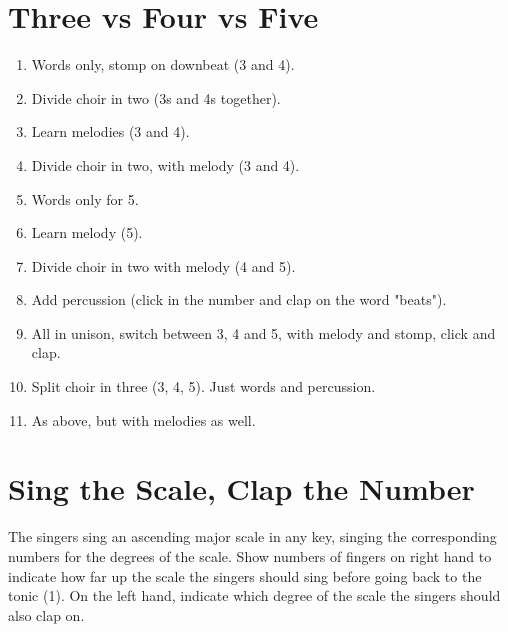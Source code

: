 \documentclass{article}
\begin{document}
\section{Three vs Four vs Five}
\begin{enumerate}
	\item Words only, stomp on downbeat (3 and 4).
	\item Divide choir in two (3s and 4s together).
	\item Learn melodies (3 and 4).
	\item Divide choir in two, with melody (3 and 4).
	\item Words only for 5.
	\item Learn melody (5).
	\item Divide choir in two with melody (4 and 5).
	\item Add percussion (click in the number and clap on the word "beats").
	\item All in unison, switch between 3, 4 and 5, with melody and stomp, click and clap.
	\item Split choir in three (3, 4, 5). Just words and percussion.
	\item As above, but with melodies as well.
\end{enumerate}

\section{Sing the Scale, Clap the Number}
The singers sing an ascending major scale in any key, singing the corresponding numbers for the degrees of the scale. Show numbers of fingers on right hand to indicate how far up the scale the singers should sing before going back to the tonic (1). On the left hand, indicate which degree of the scale the singers should also clap on.
\end{document}
